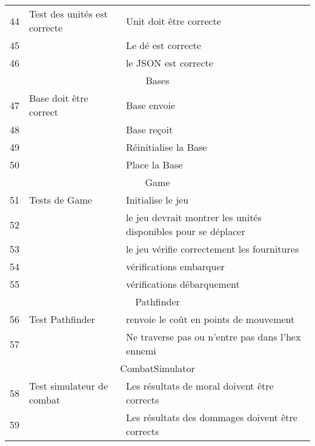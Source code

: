 \begin{center}
\begin{tabular}{|l|l|l|}
     44 & Test des unités est correcte & Unit doit être correcte \\
     45 && Le dé est correcte \\  
     46 && le JSON est correcte \\
 
     \hline 
     \multicolumn{3}{c}{Bases}\\
     \hline
 
     47 & Base doit être correct & Base envoie \\
     48 && Base reçoit \\
     49 && Réinitialise la Base \\
     50 && Place la Base\\

     \hline
    \multicolumn{3}{c}{Game}\\
    \hline
    51 & Tests de Game &  Initialise le jeu \\
    52 && le jeu devrait montrer les unités disponibles pour se déplacer\\
    53 && le jeu vérifie correctement les fournitures \\
    54 && vérifications embarquer \\
    55 && vérifications débarquement \\
    \hline
    \multicolumn{3}{c}{Pathfinder}\\
    \hline
    56 & Test Pathfinder  & renvoie le coût en points de mouvement\\ %
    57 && Ne traverse pas ou n'entre pas dans l'hex ennemi \\
    \hline
    \multicolumn{3}{c}{CombatSimulator}\\
    \hline
    58 & Test  simulateur de combat  & Les résultats de moral doivent être corrects \\
    59 && Les résultats des dommages doivent être corrects \\
     \hline
     
 

\end{tabular}
\end{center}